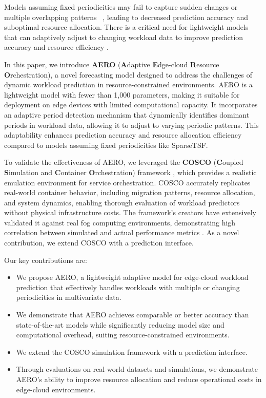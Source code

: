 \documentclass{ieeetmlcn}
\begin{document}
Models assuming fixed periodicities may fail to capture sudden changes or multiple overlapping patterns ~\cite{sparseTSF}, leading to decreased prediction accuracy and suboptimal resource allocation. There is a critical need for lightweight models that can adaptively adjust to changing workload data to improve prediction accuracy and resource efficiency \cite{fan2019urbanedge}.

In this paper, we introduce \textbf{AERO} (\textbf{A}daptive \textbf{E}dge-cloud \textbf{R}esource \textbf{O}rchestration), a novel forecasting model designed to address the challenges of dynamic workload prediction in resource-constrained environments. AERO is a lightweight model with fewer than 1,000 parameters, making it suitable for deployment on edge devices with limited computational capacity. It incorporates an adaptive period detection mechanism that dynamically identifies dominant periods in workload data, allowing it to adjust to varying periodic patterns. This adaptability enhances prediction accuracy and resource allocation efficiency compared to models assuming fixed periodicities like SparseTSF.

To validate the effectiveness of AERO, we leveraged the \textbf{COSCO} (\textbf{C}oupled \textbf{S}imulation and \textbf{C}ontainer \textbf{O}rchestration) framework \cite{tuli2021cosco}, which provides a realistic emulation environment for service orchestration. COSCO accurately replicates real-world container behavior, including migration patterns, resource allocation, and system dynamics, enabling thorough evaluation of workload predictors without physical infrastructure costs. The framework's creators have extensively validated it against real fog computing environments, demonstrating high correlation between simulated and actual performance metrics \cite{tuli2021cosco}. As a novel contribution, we extend COSCO with a prediction interface.

Our key contributions are:
\begin{itemize}
    \item We propose AERO, a lightweight adaptive model for edge-cloud workload prediction that effectively handles workloads with multiple or changing periodicities in multivariate data.
    \item We demonstrate that AERO achieves comparable or better accuracy than state-of-the-art models while significantly reducing model size and computational overhead, suiting resource-constrained environments.
    \item We extend the COSCO simulation framework with a prediction interface.
    \item Through evaluations on real-world datasets and simulations, we demonstrate AERO's ability to improve resource allocation and reduce operational costs in edge-cloud environments.
\end{itemize}
\end{document}
